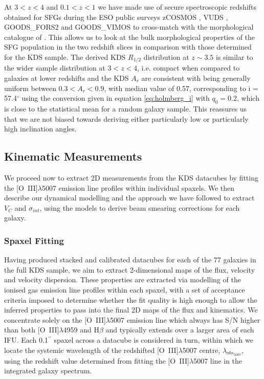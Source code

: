 \documentclass[fleqn,usenatbib]{mn2e}
\begin{document}
At $3 < z < 4$ and $0.1 < z < 1$ we have made use of secure spectroscopic redshifts obtained for SFGs during the ESO public surveys zCOSMOS \citep{Lilly2007}, VUDS \citep{Tasca2016}, GOODS\_FORS2 \citep{Vanzella2005,Vanzella2006,Vanzella2008} and GOODS\_VIMOS \citep{Balestra2010} to cross-match with the morphological catalogue of \cite{VanderWel2012}.
This allows us to look at the bulk morphological properties of the SFG population in the two redshift slices in comparison with those determined for the KDS sample.
The derived KDS $R_{1/2}$ distribution at $z \sim 3.5$ is similar to the wider sample distribution at $3 < z  < 4$, i.e. compact when compared to galaxies at lower redshifts and the KDS $A_{r}$ are consistent with being generally uniform between $0.3 < A_{r} < 0.9$, with median value of 0.57, corresponding to i = 57.4$^{\circ}$ using the conversion given in equation \ref{eq:holmberg_i} with $q_{0}=0.2$, which is close to the statistical mean for a random galaxy sample.
This reassures us that we are not biased towards deriving either particularly low or particularly high inclination angles.

\subsection{Kinematic Measurements}\label{subsection:kinematic_measurements}

We proceed now to extract 2D measurements from the KDS datacubes by fitting the [O~{\sc III}]$\lambda$5007 emission line profiles within individual spaxels.
We then describe our dynamical modelling and the approach we have followed to extract $V_{C}$ and $\sigma_{int}$, using the models to derive beam smearing corrections for each galaxy.  

\subsubsection{Spaxel Fitting}\label{subsubsection:spaxel_fitting}
Having produced stacked and calibrated datacubes for each of the 77 galaxies in the full KDS sample, we aim to extract 2-dimensional maps of the flux, velocity and velocity dispersion.
These properties are extracted via modelling of the ionised gas emission line profiles within each spaxel, with a set of acceptance criteria imposed to determine whether the fit quality is high enough to allow the inferred properties to pass into the final 2D maps of the flux and kinematics.
We concentrate solely on the [O~{\sc III}]$\lambda$5007 emission line which always has S/N higher than both [O~{\sc III}]$\lambda$4959 and H$\beta$ and typically extends over a larger area of each IFU.
Each 0.1$^{\prime\prime}$ spaxel across a datacube is considered in turn, within which we locate the systemic wavelength of the redshifted [O~{\sc III}]$\lambda$5007 centre, $\lambda_{obs_{5007}}$, using the redshift value determined from fitting the [O~{\sc III}]$\lambda$5007 line in the integrated galaxy spectrum.
\end{document}
